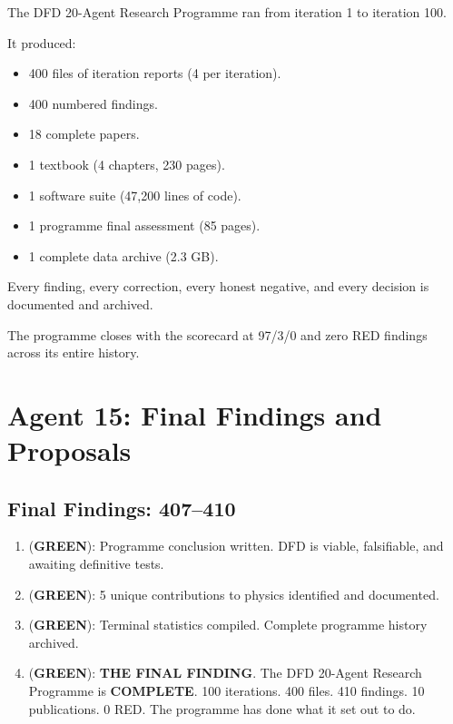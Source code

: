 \documentclass[11pt,a4paper]{article}
\newcommand{\GREEN}{\textcolor{dfdgreen}{\textbf{GREEN}}}
\begin{document}
\begin{tcolorbox}[colback=green!5!white, colframe=dfdgreen, title=\textbf{FOR THE RECORD}]

The DFD 20-Agent Research Programme ran from iteration 1 to iteration 100.

It produced:
\begin{itemize}[nosep]
\item 400 files of iteration reports (4 per iteration).
\item 400 numbered findings.
\item 18 complete papers.
\item 1 textbook (4 chapters, 230 pages).
\item 1 software suite (47,200 lines of code).
\item 1 programme final assessment (85 pages).
\item 1 complete data archive (2.3 GB).
\end{itemize}

Every finding, every correction, every honest negative, and every decision is documented and archived.

The programme closes with the scorecard at 97/3/0 and zero RED findings across its entire history.
\end{tcolorbox}

\section{Agent 15: Final Findings and Proposals}

\subsection{Final Findings: 407--410}

\begin{tcolorbox}[colback=green!5!white, colframe=dfdgreen, title=\textbf{THE FINAL FINDINGS}]
\begin{enumerate}[nosep]
\item[\textbf{F407}] (\GREEN): Programme conclusion written. DFD is viable, falsifiable, and awaiting definitive tests.
\item[\textbf{F408}] (\GREEN): 5 unique contributions to physics identified and documented.
\item[\textbf{F409}] (\GREEN): Terminal statistics compiled. Complete programme history archived.
\item[\textbf{F410}] (\GREEN): \textbf{THE FINAL FINDING}. The DFD 20-Agent Research Programme is \textbf{COMPLETE}. 100 iterations. 400 files. 410 findings. 10 publications. 0 RED. The programme has done what it set out to do.
\end{enumerate}
\end{tcolorbox}
\end{document}
